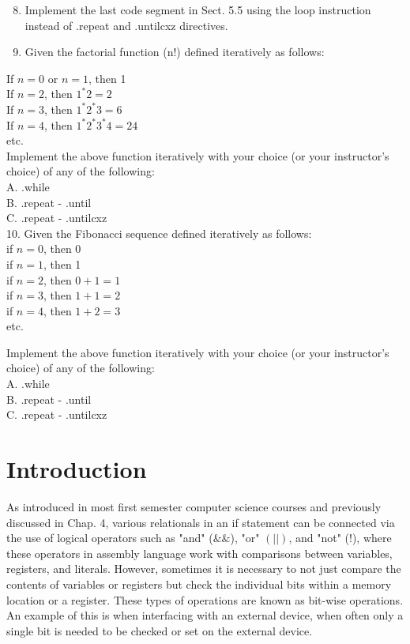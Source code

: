 \documentclass[10pt]{book}
\begin{document}
\begin{enumerate}
  \setcounter{enumi}{7}
  \item Implement the last code segment in Sect. 5.5 using the loop instruction instead of .repeat and .untilcxz directives.
  \item Given the factorial function (n!) defined iteratively as follows:
\end{enumerate}
If $n=0$ or $n=1$, then 1\\
If $n=2$, then $1^{*} 2=2$\\
If $n=3$, then $1^{*} 2^{*} 3=6$\\
If $n=4$, then $1^{*} 2^{*} 3^{*} 4=24$\\
etc.\\
Implement the above function iteratively with your choice (or your instructor's choice) of any of the following:\\
A. .while\\
B. .repeat - .until\\
C. .repeat - .untilcxz\\
10. Given the Fibonacci sequence defined iteratively as follows:\\
if $n=0$, then 0\\
if $n=1$, then 1\\
if $n=2$, then $0+1=1$\\
if $n=3$, then $1+1=2$\\
if $n=4$, then $1+2=3$\\
etc.

Implement the above function iteratively with your choice (or your instructor's choice) of any of the following:\\
A. .while\\
B. .repeat - .until\\
C. .repeat - .untilcxz

\section{Introduction}
As introduced in most first semester computer science courses and previously discussed in Chap. 4, various relationals in an if statement can be connected via the use of logical operators such as "and" ($\&\&$), "or" $(|\mid)$, and "not" (!), where these operators in assembly language work with comparisons between variables, registers, and literals. However, sometimes it is necessary to not just compare the contents of variables or registers but check the individual bits within a memory location or a register. These types of operations are known as bit-wise operations. An example of this is when interfacing with an external device, when often only a single bit is needed to be checked or set on the external device.
\end{document}
